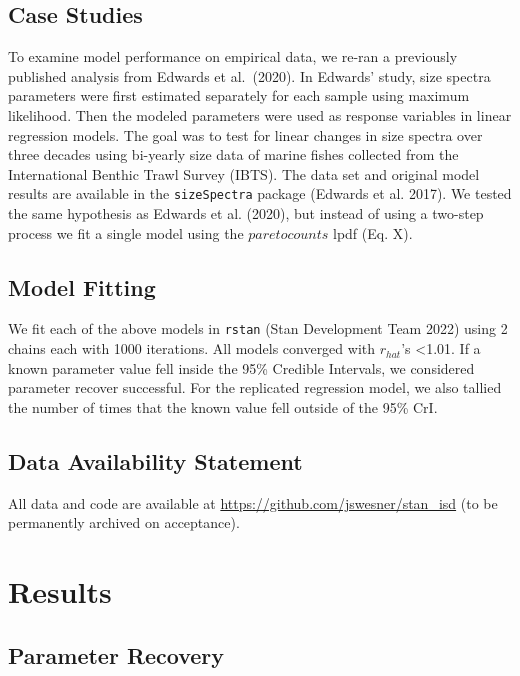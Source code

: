 \documentclass[
  12pt,
]{article}
\numberwithin{equation}
\begin{document}
\hypertarget{case-studies}{%
\subsection{Case Studies}\label{case-studies}}

To examine model performance on empirical data, we re-ran a previously
published analysis from Edwards et al.~(2020). In Edwards' study, size
spectra parameters were first estimated separately for each sample using
maximum likelihood. Then the modeled parameters were used as response
variables in linear regression models. The goal was to test for linear
changes in size spectra over three decades using bi-yearly size data of
marine fishes collected from the International Benthic Trawl Survey
(IBTS). The data set and original model results are available in the
\texttt{sizeSpectra} package (Edwards et al. 2017). We tested the same
hypothesis as Edwards et al. (2020), but instead of using a two-step
process we fit a single model using the \(paretocounts\) lpdf (Eq. X).

\hypertarget{model-fitting}{%
\subsection{Model Fitting}\label{model-fitting}}

We fit each of the above models in \texttt{rstan} (Stan Development Team
2022) using 2 chains each with 1000 iterations. All models converged
with \(r_{hat}\)'s \textless1.01. If a known parameter value fell inside
the 95\% Credible Intervals, we considered parameter recover successful.
For the replicated regression model, we also tallied the number of times
that the known value fell outside of the 95\% CrI.

\hypertarget{data-availability-statement}{%
\subsection{Data Availability
Statement}\label{data-availability-statement}}

All data and code are available at
\url{https://github.com/jswesner/stan_isd} (to be permanently archived
on acceptance).

\hypertarget{results}{%
\section{Results}\label{results}}

\hypertarget{parameter-recovery}{%
\subsection{Parameter Recovery}\label{parameter-recovery}}
\end{document}
